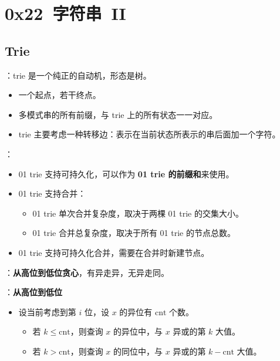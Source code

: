 \section{0x22\ 字符串\ II}
\label{sec:0x22}

\subsection{Trie}

：trie 是一个纯正的自动机，形态是树。

\begin{itemize}
    \item 一个起点，若干终点。
    \item 多模式串的所有前缀，与 trie 上的所有状态一一对应。
    \item trie 主要考虑一种转移边：表示在当前状态所表示的串后面加一个字符。
\end{itemize}

：

\begin{itemize}
    \item 01 trie 支持可持久化，可以作为 \textbf{01 trie 的前缀和}来使用。
    \item 01 trie 支持合并：
    \begin{itemize}
        \item 01 trie 单次合并复杂度，取决于两棵 01 trie 的交集大小。
        \item 01 trie 合并总复杂度，取决于所有 01 trie 的节点总数。
    \end{itemize}
    \item 01 trie 支持可持久化合并，需要在合并时新建节点。
\end{itemize}



：\textbf{从高位到低位贪心}，有异走异，无异走同。

：\textbf{从高位到低位}

\begin{itemize}
    \item 设当前考虑到第 $i$ 位，设 $x$ 的异位有 $\mathrm{cnt}$ 个数。
    \begin{itemize}
        \item 若 $k \leq \mathrm{cnt}$，则查询 $x$ 的异位中，与 $x$ 异或的第 $k$ 大值。
        \item 若 $k > \mathrm{cnt}$，则查询 $x$ 的同位中，与 $x$ 异或的第 $k - \mathrm{cnt}$ 大值。
    \end{itemize}
\end{itemize}

